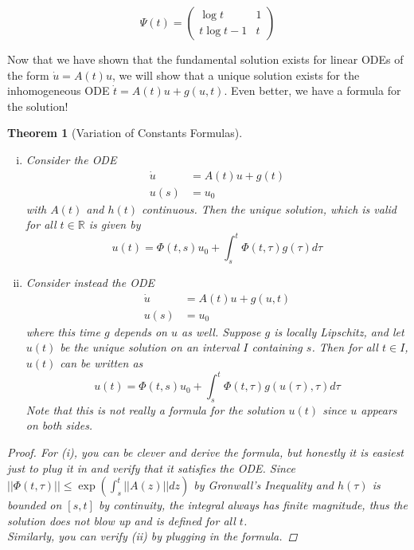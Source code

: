 \documentclass{article}
\newtheorem{theorem}{Theorem}[section]
\def\R{{\mathbb R}}
\begin{document}
\[
\Psi(t) = \begin{pmatrix}
\log t & 1 \\
t \log t - 1 & t 
\end{pmatrix}
\]

Now that we have shown that the fundamental solution exists for linear ODEs of the form $\dot{u} = A(t) u$, we will show that a unique solution exists for the inhomogeneous ODE $\dot{t} = A(t)u + g(u, t)$. Even better, we have a formula for the solution!\\

\begin{theorem}[Variation of Constants Formulas]\label{VOC}
\begin{enumerate}[(i)]
\item Consider the ODE
\begin{align*}
\dot{u} &= A(t)u + g(t) \\
u(s) &= u_0
\end{align*}
with $A(t)$ and $h(t)$ continuous. Then the unique solution, which is valid for all $t \in \R$ is given by
\begin{equation}\label{VOC1}
u(t) = \Phi(t,s)u_0 + \int_s^t \Phi(t, \tau) g(\tau) d \tau
\end{equation}
\item Consider instead the ODE
\begin{align*}
\dot{u} &= A(t)u + g(u, t) \\
u(s) &= u_0
\end{align*}
where this time $g$ depends on $u$ as well. Suppose $g$ is locally Lipschitz, and let $u(t)$ be the unique solution on an interval $I$ containing $s$. Then for all $t \in I$, $u(t)$ can be written as
\begin{equation}\label{VOC2}
u(t) = \Phi(t,s)u_0 + \int_s^t \Phi(t, \tau) g(u(\tau), \tau) d \tau
\end{equation}
Note that this is not really a formula for the solution $u(t)$ since $u$ appears on both sides.
\end{enumerate}
\begin{proof}
For (i), you can be clever and derive the formula, but honestly it is easiest just to plug it in and verify that it satisfies the ODE. Since $||\Phi(t,\tau)|| \leq \exp\left( \int_s^t ||A(z)|| dz \right)$ by Gronwall's Inequality and $h(\tau)$ is bounded on $[s, t]$ by continuity, the integral always has finite magnitude, thus the solution does not blow up and is defined for all $t$.\\

Similarly, you can verify (ii) by plugging in the formula.
\end{proof}
\end{theorem}
\end{document}
